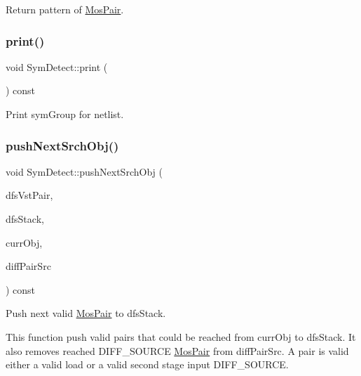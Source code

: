 Return pattern of \hyperlink{classMosPair}{Mos\+Pair}. 

\mbox{\label{classSymDetect_a3e0354c4c11fe698377a4688c52fd533}} 
\subsubsection{\texorpdfstring{print()}{print()}}
{\footnotesize\ttfamily void Sym\+Detect\+::print (\begin{DoxyParamCaption}{ }\end{DoxyParamCaption}) const}



Print sym\+Group for netlist. 

\mbox{\label{classSymDetect_a7f4cd1010a21da88d35abb89c6f33f00}} 
\subsubsection{\texorpdfstring{push\+Next\+Srch\+Obj()}{pushNextSrchObj()}}
{\footnotesize\ttfamily void Sym\+Detect\+::push\+Next\+Srch\+Obj (\begin{DoxyParamCaption}\item[{std\+::vector$<$ \hyperlink{classMosPair}{Mos\+Pair} $>$ \&}]{dfs\+Vst\+Pair,  }\item[{std\+::vector$<$ \hyperlink{classMosPair}{Mos\+Pair} $>$ \&}]{dfs\+Stack,  }\item[{\hyperlink{classMosPair}{Mos\+Pair} \&}]{curr\+Obj,  }\item[{std\+::vector$<$ \hyperlink{classMosPair}{Mos\+Pair} $>$ \&}]{diff\+Pair\+Src }\end{DoxyParamCaption}) const\hspace{0.3cm}{\ttfamily [private]}}



Push next valid \hyperlink{classMosPair}{Mos\+Pair} to dfs\+Stack. 

This function push valid pairs that could be reached from curr\+Obj to dfs\+Stack. It also removes reached D\+I\+F\+F\+\_\+\+S\+O\+U\+R\+CE \hyperlink{classMosPair}{Mos\+Pair} from diff\+Pair\+Src. A pair is valid either a valid load or a valid second stage input D\+I\+F\+F\+\_\+\+S\+O\+U\+R\+CE.

